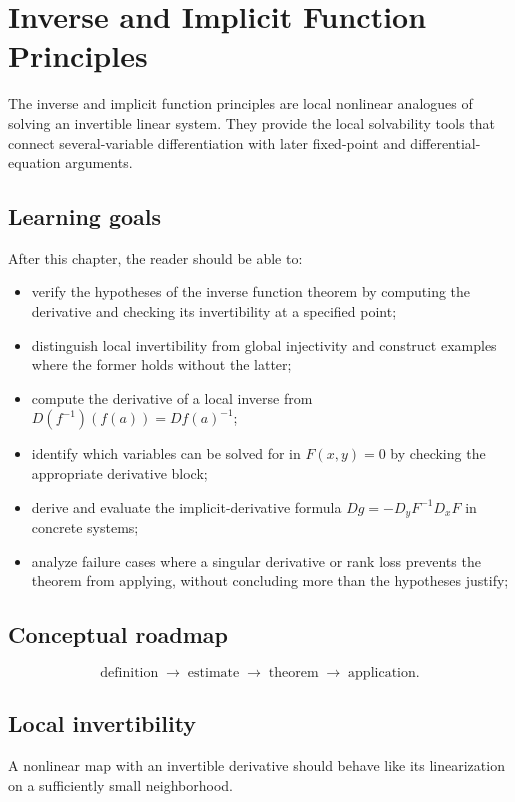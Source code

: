 \chapter{Inverse and Implicit Function Principles}
\label{ch:ii09}

The inverse and implicit function principles are local nonlinear analogues of solving an invertible linear system. They provide the local solvability tools that connect several-variable differentiation with later fixed-point and differential-equation arguments.

\section*{Learning goals}
After this chapter, the reader should be able to:
\begin{itemize}
\item verify the hypotheses of the inverse function theorem by computing the derivative and checking its invertibility at a specified point;
\item distinguish local invertibility from global injectivity and construct examples where the former holds without the latter;
\item compute the derivative of a local inverse from \(D(f^{-1})(f(a))=Df(a)^{-1}\);
\item identify which variables can be solved for in \(F(x,y)=0\) by checking the appropriate derivative block;
\item derive and evaluate the implicit-derivative formula \(Dg=-D_yF^{-1}D_xF\) in concrete systems;
\item analyze failure cases where a singular derivative or rank loss prevents the theorem from applying, without concluding more than the hypotheses justify;
\end{itemize}
\section*{Conceptual roadmap}
\[
\boxed{\text{definition}\;\longrightarrow\;\text{estimate}\;\longrightarrow\;\text{theorem}\;\longrightarrow\;\text{application}.}
\]

\section{Local invertibility}
A nonlinear map with an invertible derivative should behave like its linearization on a sufficiently small neighborhood.

